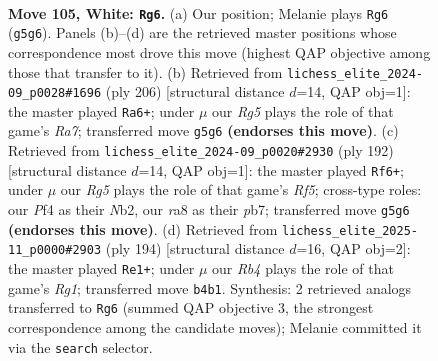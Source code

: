 \documentclass[11pt]{article}
\begin{document}
\clearpage

\begin{figure}[p]\centering
\begin{subfigure}{0.46\textwidth}\centering
\resizebox{\linewidth}{!}{%
\newchessgame
\chessboard[
  setfen={r7/8/2k1p3/6R1/1R2PP2/8/8/5K2 w - - 1 105},
  showmover=false,
  pgfstyle=straightmove, color=movearrow, markmove={g5-g6}
]}
\caption{}
\end{subfigure}\hfill
\begin{subfigure}{0.46\textwidth}\centering
\resizebox{\linewidth}{!}{%
\newchessgame
\chessboard[
  setfen={8/R7/5k2/7p/7P/6P1/5K2/1r6 w - - 84 104},
  showmover=false,
  pgfstyle=straightmove, color=movearrow, markmove={a7-a6}
]}
\caption{}
\end{subfigure}
\\[4pt]
\begin{subfigure}{0.46\textwidth}\centering
\resizebox{\linewidth}{!}{%
\newchessgame
\chessboard[
  setfen={8/1p6/p2k4/P4R2/8/1K6/1N6/7r w - - 33 97},
  showmover=false,
  pgfstyle=straightmove, color=movearrow, markmove={f5-f6}
]}
\caption{}
\end{subfigure}\hfill
\begin{subfigure}{0.46\textwidth}\centering
\resizebox{\linewidth}{!}{%
\newchessgame
\chessboard[
  setfen={8/8/8/4k3/r5p1/2K3P1/7P/6R1 w - - 1 98},
  showmover=false,
  pgfstyle=straightmove, color=movearrow, markmove={g1-e1}
]}
\caption{}
\end{subfigure}
\caption{\textbf{Move 105, White: \texttt{Rg6}.} (a) Our position; Melanie plays \texttt{Rg6} (\texttt{g5g6}). Panels (b)--(d) are the retrieved master positions whose correspondence most drove this move (highest QAP objective among those that transfer to it). (b) Retrieved from \texttt{lichess\_elite\_2024-09\_p0028\#1696} (ply 206) [structural distance $d$=14, QAP obj=1]: the master played \texttt{Ra6+}; under $\mu$ our \emph{Rg5} plays the role of that game's \emph{Ra7}; transferred move \texttt{g5g6} \textbf{(endorses this move)}. (c) Retrieved from \texttt{lichess\_elite\_2024-09\_p0020\#2930} (ply 192) [structural distance $d$=14, QAP obj=1]: the master played \texttt{Rf6+}; under $\mu$ our \emph{Rg5} plays the role of that game's \emph{Rf5}; cross-type roles: our \emph{P}f4 as their \emph{N}b2, our \emph{r}a8 as their \emph{p}b7; transferred move \texttt{g5g6} \textbf{(endorses this move)}. (d) Retrieved from \texttt{lichess\_elite\_2025-11\_p0000\#2903} (ply 194) [structural distance $d$=16, QAP obj=2]: the master played \texttt{Re1+}; under $\mu$ our \emph{Rb4} plays the role of that game's \emph{Rg1}; transferred move \texttt{b4b1}. Synthesis: 2 retrieved analogs transferred to \texttt{Rg6} (summed QAP objective 3, the strongest correspondence among the candidate moves); Melanie committed it via the \texttt{search} selector.}
\label{fig:thought-m208}
\end{figure}
\end{document}
